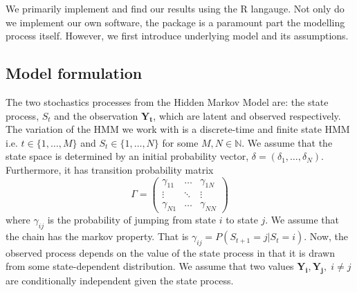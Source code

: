 We primarily implement and find our results using the R langauge.
Not only do we implement our own software, the package  \cite{momentuHMM} is a paramount part the modelling process itself. However, we first introduce underlying model and its assumptions.
\subsection*{Model formulation}
The two stochastics processes from the Hidden Markov Model are: the state process, $S_t$ and the observation $\mathbf{Y_t}$, which are latent and observed respectively. The variation of the HMM we work with is a discrete-time and finite state HMM i.e. $t\in\{1,\dots , M\}$ and $S_t\in\{1,\dots , N\}$ for some $M, N\in\mathbb{N}$. We assume that the state space is determined by an initial probability vector, $\delta = \left(\delta_1,\dots, \delta_N \right)$. Furthermore, it has transition probability matrix
\[
    \Gamma = \begin{pmatrix}
        \gamma_{11} & \dots &  \gamma_{1N} \\
        \vdots & \ddots & \vdots \\
        \gamma_{N1} & \dots & \gamma_{NN}
    \end{pmatrix}
\]
where $\gamma_{ij}$ is the probability of jumping from state $i$ to state $j$. We assume that the chain has the markov property. That is $\gamma_{ij} = P\left(S_{t+1} = j | S_t = i\right)$. Now, the observed process depends on the value of the state process in that it is drawn from some state-dependent distribution. We assume that two values $\mathbf{Y_i}, \mathbf{Y_j},\; i\neq j$ are conditionally independent given the state process.